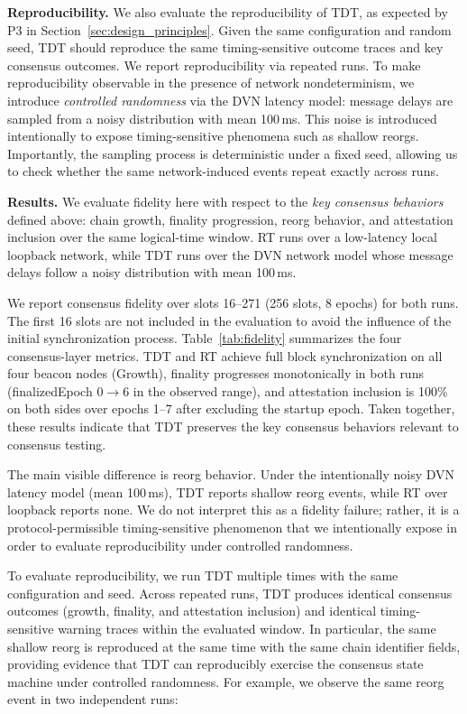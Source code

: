 \smallskip
\noindent\textbf{Reproducibility.}
We also evaluate the reproducibility of TDT, as expected by P3 in Section~\ref{sec:design_principles}.
Given the same configuration and random seed, TDT should reproduce the same timing-sensitive outcome traces and key consensus outcomes.
We report reproducibility via repeated runs.
To make reproducibility observable in the presence of network nondeterminism, we introduce \emph{controlled randomness} via the DVN latency model: message delays are sampled from a noisy distribution with mean 100\,ms. This noise is introduced intentionally to expose timing-sensitive phenomena such as shallow reorgs. Importantly, the sampling process is deterministic under a fixed seed, allowing us to check whether the same network-induced events repeat exactly across runs.


\smallskip
\noindent\textbf{Results.}
We evaluate fidelity here with respect to the \emph{key consensus behaviors} defined above: chain growth, finality progression, reorg behavior, and attestation inclusion over the same logical-time window. RT runs over a low-latency local loopback network, while TDT runs over the DVN network model whose message delays follow a noisy distribution with mean 100\,ms.

We report consensus fidelity over slots 16--271 (256 slots, 8 epochs) for both runs. The first 16 slots are not included in the evaluation to avoid the influence of the initial synchronization process.
Table~\ref{tab:fidelity} summarizes the four consensus-layer metrics. TDT and RT achieve full block synchronization on all four beacon nodes (Growth), finality progresses monotonically in both runs (finalizedEpoch 0$\to$6 in the observed range), and attestation inclusion is 100\% on both sides over epochs 1--7 after excluding the startup epoch. Taken together, these results indicate that TDT preserves the key consensus behaviors relevant to consensus testing.

The main visible difference is reorg behavior. Under the intentionally noisy DVN latency model (mean 100\,ms), TDT reports shallow reorg events, while RT over loopback reports none. We do not interpret this as a fidelity failure; rather, it is a protocol-permissible timing-sensitive phenomenon that we intentionally expose in order to evaluate reproducibility under controlled randomness.

To evaluate reproducibility, we run TDT multiple times with the same configuration and seed. Across repeated runs, TDT produces identical consensus outcomes (growth, finality, and attestation inclusion) and identical timing-sensitive warning traces within the evaluated window. In particular, the same shallow reorg is reproduced at the same time with the same chain identifier fields, providing evidence that TDT can reproducibly exercise the consensus state machine under controlled randomness. For example, we observe the same reorg event in two independent runs:

